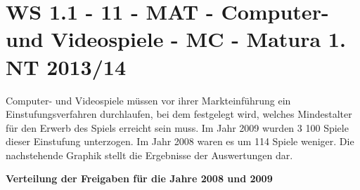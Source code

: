 \section{WS 1.1 - 11 - MAT - Computer- und Videospiele - MC - Matura 1. NT 2013/14}

\begin{beispiel}[WS 1.1]{1} %
				Computer- und Videospiele müssen vor ihrer Markteinführung ein Einstufungsverfahren durchlaufen, bei dem festgelegt wird, welches Mindestalter für den Erwerb des Spiels erreicht sein muss. Im Jahr 2009 wurden 3 100 Spiele dieser Einstufung unterzogen. Im Jahr 2008 waren es um 114 Spiele weniger. Die nachstehende Graphik stellt die Ergebnisse der Auswertungen dar.
				
				\begin{center}
					\textbf{Verteilung der Freigaben für die Jahre 2008 und 2009}
					

\end{center}
\end{beispiel}
